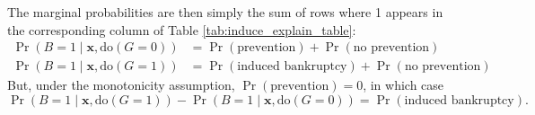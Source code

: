 \documentclass[aoas,preprint, 11pt, dvipsnames, table, x11name]{imsart}
\renewcommand{\bm}[1]{\mathbf{#1}}
\theoremstyle{remark}
\begin{document}
The marginal probabilities are then simply the sum of rows where 1 appears in the corresponding column of Table \ref{tab:induce_explain_table}:
\begin{equation}
\begin{split}
	\Pr(B=1\mid \bm{x}, \text{do}(G=0))&=\Pr(\text{prevention})+\Pr(\text{no prevention})\\
\Pr(B=1\mid \bm{x}, \text{do}(G=1))&=\Pr(\text{induced bankruptcy})+\Pr(\text{no prevention})
\end{split}
\end{equation}
But, under the monotonicity assumption, $\Pr(\text{prevention}) = 0$, in which case
\begin{equation}
	\Pr(B=1\mid \bm{x}, \text{do}(G=1))-\Pr(B=1\mid \bm{x}, \text{do}(G=0))=\Pr(\text{induced  bankruptcy}).
	\label{prevent_eq}
\end{equation}

\end{document}
